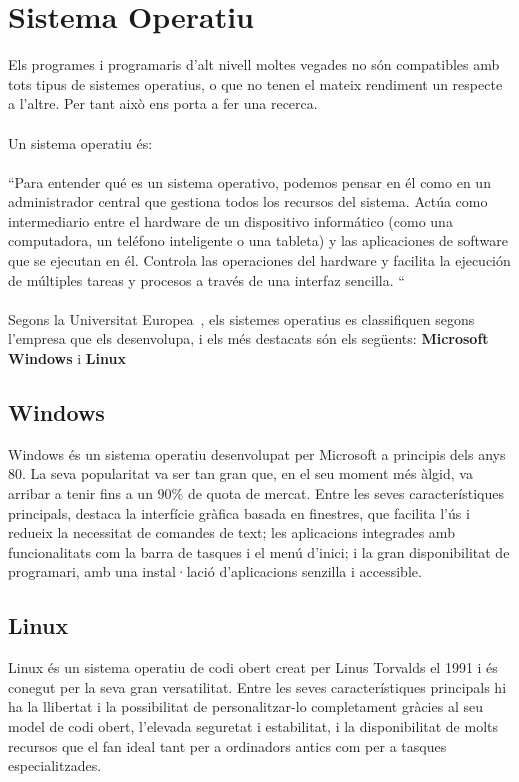 \section{Sistema Operatiu}
Els programes i programaris d'alt nivell moltes vegades no són compatibles amb tots tipus de sistemes operatius, o que no tenen el mateix rendiment un respecte a l'altre. Per tant això ens porta a fer una recerca.\\ \\
Un sistema operatiu és:\\ \\
{\color{gray}``Para entender qué es un sistema operativo, podemos pensar en él como en un administrador central que gestiona todos los recursos del sistema. Actúa como intermediario entre el hardware de un dispositivo informático (como una computadora, un teléfono inteligente o una tableta) y las aplicaciones de software que se ejecutan en él. Controla las operaciones del hardware y facilita la ejecución de múltiples tareas y procesos a través de una interfaz sencilla. ``}\\ \\
 Segons la Universitat Europea~\cite{UniversitatEuropea}, els sistemes operatius es classifiquen segons l’empresa que els desenvolupa, i els més destacats són els següents: \textbf{Microsoft Windows} i \textbf{Linux}

\subsection{Windows}

Windows és un sistema operatiu desenvolupat per Microsoft a principis dels anys 80. La seva popularitat va ser tan gran que, en el seu moment més àlgid, va arribar a tenir fins a un 90\% de quota de mercat. Entre les seves característiques principals, destaca la interfície gràfica basada en finestres, que facilita l’ús i redueix la necessitat de comandes de text; les aplicacions integrades amb funcionalitats com la barra de tasques i el menú d’inici; i la gran disponibilitat de programari, amb una instal·lació d’aplicacions senzilla i accessible.

\subsection{Linux}

Linux és un sistema operatiu de codi obert creat per Linus Torvalds el 1991 i és conegut per la seva gran versatilitat. Entre les seves característiques principals hi ha la llibertat i la possibilitat de personalitzar-lo completament gràcies al seu model de codi obert, l’elevada seguretat i estabilitat, i la disponibilitat de molts recursos que el fan ideal tant per a ordinadors antics com per a tasques especialitzades.
